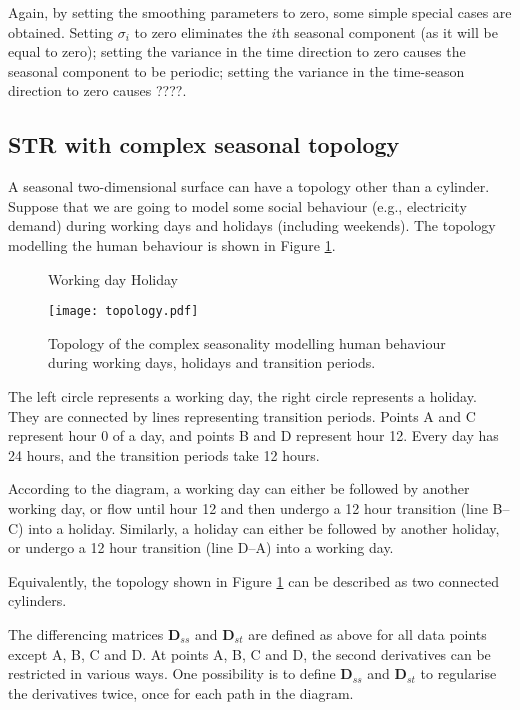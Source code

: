 \documentclass[11pt,a4paper,]{article}
\begin{document}
Again, by setting the smoothing parameters to zero, some simple special cases are obtained. Setting \(\sigma_i\) to zero eliminates the \(i\)th seasonal component (as it will be equal to zero); setting the variance in the time direction to zero causes the seasonal component to be periodic; setting the variance in the time-season direction to zero causes ????.

\hypertarget{sec:complex-topology}{%
\subsection{STR with complex seasonal topology}\label{sec:complex-topology}}

A seasonal two-dimensional surface can have a topology other than a cylinder. Suppose that we are going to model some social behaviour (e.g., electricity demand) during working days and holidays (including weekends). The topology modelling the human behaviour is shown in Figure \ref{fig:topology_pdf}.

\begin{figure}[!hbt]
  \centering
  \centerline{Working day \hspace*{4.5cm} Holiday}
  \texttt{[image: topology.pdf]}
  \caption{Topology of the complex seasonality modelling human behaviour during working days, holidays and transition periods.}
  \label{fig:topology_pdf}
\end{figure}

The left circle represents a working day, the right circle represents a holiday. They are connected by lines representing transition periods. Points A and C represent hour 0 of a day, and points B and D represent hour 12. Every day has 24 hours, and the transition periods take 12 hours.

According to the diagram, a working day can either be followed by another working day, or flow until hour 12 and then undergo a 12 hour transition (line B--C) into a holiday. Similarly, a holiday can either be followed by another holiday, or undergo a 12 hour transition (line D--A) into a working day.

Equivalently, the topology shown in Figure \ref{fig:topology_pdf} can be described as two connected cylinders.

The differencing matrices \(\bm{D}_{ss}\) and \(\bm{D}_{st}\) are defined as above for all data points except A, B, C and D. At points A, B, C and D, the second derivatives can be restricted in various ways. One possibility is to define \(\bm{D}_{ss}\) and \(\bm{D}_{st}\) to regularise the derivatives twice, once for each path in the diagram.
\end{document}
